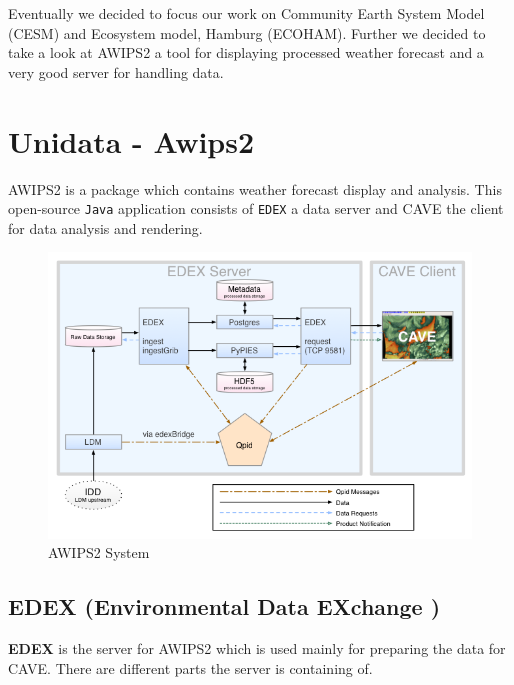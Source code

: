 \documentclass[]{article}
\begin{document}
Eventually we decided to focus our work on Community Earth System Model
(CESM) and Ecosystem model, Hamburg (ECOHAM). Further we decided to take
a look at AWIPS2 a tool for displaying processed weather forecast and a
very good server for handling data.

\pagebreak

\section{Unidata - Awips2}\label{unidata---awips2}

AWIPS2 is a package which contains weather forecast display and
analysis. This open-source \texttt{Java} application consists of
\texttt{EDEX} a data server and CAVE the client for data analysis and
rendering.

\begin{figure}[htbp]
\centering
\includegraphics{pics/awips2_coms.png}
\caption{AWIPS2 System}
\end{figure}

\subsection{EDEX (Environmental Data EXchange
)}\label{edex-environmental-data-exchange}

\textbf{EDEX} is the server for AWIPS2 which is used mainly for
preparing the data for CAVE. There are different parts the server is
containing of.
\end{document}
